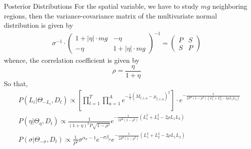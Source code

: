 \documentclass[10pt]{beamer} %
\begin{document}
\begin{frame}{Posterior Distributions}
For the spatial variable, we have to study $ mg $ neighboring regions, then the variance-covariance matrix of the multivariate normal distribution is given by
\begin{align*}
	\sigma^{-1}\cdot\left( \begin{array}{cc}
	1+|\eta|\cdot mg & -\eta \\
	-\eta & 1+|\eta|\cdot mg
	\end{array} \right)^{-1} =\left( \begin{array}{cc}
	P&S\\
	S&P
	\end{array}\right)
\end{align*}
whence, the correlation coefficient is given by 
$$\rho =\frac{\eta}{1+\eta}$$
So that,
\begin{align*}
&P(L_i|\Theta_{-L_i},D_{t})\propto\left[\prod_{t=1}^{T}\prod_{a=1}^{A}e^{-\frac{\tau}{2}(M_{t,i,a}-\mu_{t,i,a})^2}\right]\cdot e^{-\frac{1}{2P^2(1-\rho^2)\left(L_1^2+L_2^2-2\rho L_1L_2\right)}}\\
    &P(\eta|\Theta_{\eta},D_{t})\propto \frac{1}{(1+\eta)^2P\sqrt{1-\rho^2}}e^{-\frac{1}{2P^2(1-\rho^2)}(L_1^2+L_2^2-2\rho L_1L_2)}\\
    &P(\sigma|\Theta_{-\sigma},D_{t})\propto \frac{1}{P^2}\sigma^{\alpha_\sigma-1}e^{-\sigma \beta_\sigma}e^{-\frac{1}{2P^2(1-\rho^2)}(L_1^2+L_2^2-2\rho L_1L_2)}
\end{align*}

\end{frame}
\end{document}
